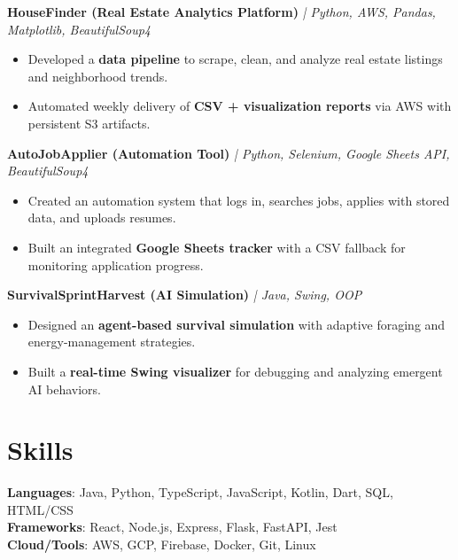 \documentclass[8pt]{resume}
\begin{document}
\textbf{HouseFinder (Real Estate Analytics Platform)} \textit{| Python, AWS, Pandas, Matplotlib, BeautifulSoup4}
\begin{itemize}
    \item Developed a \textbf{data pipeline} to scrape, clean, and analyze real estate listings and neighborhood trends.
    \item Automated weekly delivery of \textbf{CSV + visualization reports} via AWS with persistent S3 artifacts.
\end{itemize}

\textbf{AutoJobApplier (Automation Tool)} \textit{| Python, Selenium, Google Sheets API, BeautifulSoup4}
\begin{itemize}
    \item Created an automation system that logs in, searches jobs, applies with stored data, and uploads resumes.
    \item Built an integrated \textbf{Google Sheets tracker} with a CSV fallback for monitoring application progress.
\end{itemize}

\textbf{SurvivalSprintHarvest (AI Simulation)} \textit{| Java, Swing, OOP}
\begin{itemize}
    \item Designed an \textbf{agent-based survival simulation} with adaptive foraging and energy-management strategies.
    \item Built a \textbf{real-time Swing visualizer} for debugging and analyzing emergent AI behaviors.
\end{itemize}

\section{Skills}
\textbf{Languages}: Java, Python, TypeScript, JavaScript, Kotlin, Dart, SQL, HTML/CSS\\
\textbf{Frameworks}: React, Node.js, Express, Flask, FastAPI, Jest\\
\textbf{Cloud/Tools}: AWS, GCP, Firebase, Docker, Git, Linux\\
\end{document}
